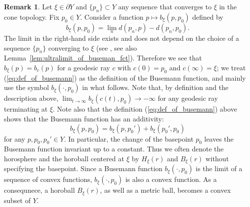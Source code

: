 \documentclass[12pt]{amsart}
\numberwithin{equation}{section}
\theoremstyle{plain}
\theoremstyle{definition}
\newtheorem{Remark}[Theorem]{Remark}
\theoremstyle{remark}
\begin{document}
\begin{Remark}
\label{rem:busemann_fct}
 Let $\xi \in \partial Y$ and $\{p_n\}\subset Y$ any sequence that
 converges to $\xi$ in the cone topology. Fix $p_0 \in Y$. 
 Consider a function $p\mapsto b_{\xi}(p,p_0)$ defined by
\begin{equation}
\label{eq:def_of_busemann}
  b_{\xi}(p,p_0)= \lim_n d(p_n,p)-d(p_n,p_0). 
\end{equation}
 The limit in the right-hand side exists and does not depend on the
 choice of a sequence $\{p_n\}$ converging to $\xi$ 
 (see \cite[p.269, 8.19 Corollary]{bridson-haefliger}, see also
 Lemma~\ref{lem:ultralimit_of_buseman_fct}). 
 Therefore we see that $b_{\xi}(p)=b_c(p)$ for a geodesic ray $c$ with 
 $c(0)=p_0$ and $c(\infty)=\xi$;
 we treat (\ref{eq:def_of_busemann}) as the definition of the Busemann
 function, and mainly use the symbol $b_{\xi}(\cdot,p_0)$ in what
 follows. 
 Note that, by definition and the description above,  
 $\lim_{t\to \infty}b_{\xi}(c(t),p_0)\to -\infty$ for any geodesic ray
 terminating at $\xi$. 
 Note also that the definition (\ref{eq:def_of_busemann}) above shows that
 the Busemann function has an additivity:
 \begin{equation}
  \label{eq:additivity}
  b_{\xi}(p,p_0)=b_{\xi}(p,p_0')+ b_{\xi}(p_0',p_0)
 \end{equation}
 for any $p,p_0,p_0' \in Y$. 
 In particular, the change of the basepoint $p_0$ leaves the Busemann
 function invariant up to a constant. 
 Thus we often denote the horosphere and the horoball centered at $\xi$
 by $H_{\xi}(r)$ and $B_{\xi}(r)$ without specifying the basepoint. 
 Since a Busemann function $b_{\xi}(\cdot,p_0)$ is the limit of a
 sequence of convex functions,  $b_{\xi}(\cdot,p_0)$ is also a convex
 function. 
 As a consequnece, a horoball $B_{\xi}(r)$, as well as a metric ball,
 becomes a convex subset of $Y$. 
\end{Remark}
\end{document}
